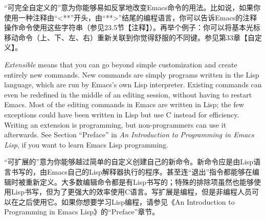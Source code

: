 “可完全自定义的”意为你能够易如反掌地改变Emacs命令的用法。比如说，如果你使用一种注释由“<**”开头，由“**>”结尾的编程语言，你可以告诉Emacs的注释操作命令使用这些字符串（参见23.5节【注释】）。再举个例子：你可以将基本光标移动命令（上、下、左、右）重新关联到你觉得舒服的不同键。参见第33章【自定义】。\par
\textit{Extensible} means that you can go beyond simple customization and create entirely new commands. New commands are simply programs written in the Lisp language, which are run by Emacs’s own Lisp interpreter. Existing commands can even be redefined in the middle of an editing session, without having to restart Emacs. Most of the editing commands in Emacs are written in Lisp; the few exceptions could have been written in Lisp but use C instead for efficiency. Writing an extension is programming, but non-programmers can use it afterwards. See Section “Preface” in \textit{An Introduction to Programming in Emacs Lisp}, if you want to learn Emacs Lisp programming.\par
“可扩展的”意为你能够越过简单的自定义创建自己的新命令。新命令应是由Lisp语言书写的，由Emacs自己的Lisp解释器执行的程序。甚至连“退出”指令都能够在编辑时被重新定义。大多数编辑命令都是有Lisp书写的；特殊的排除项虽然也能够使用Lisp书写，但为了更强大的效率使用C语言。写扩展是编程，但是非编程人员可以在之后使用它。如果你想要学习Lisp编程，请参见《An Introduction to Programming in Emacs Lisp》的“Preface”章节。